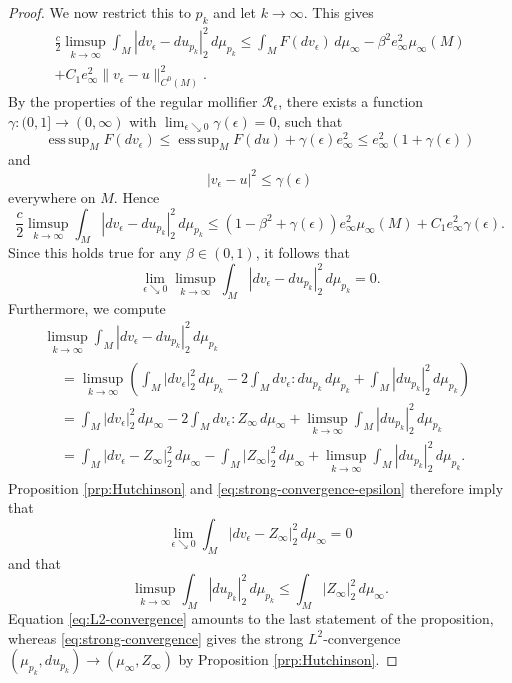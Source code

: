 \documentclass[10pt,a4paper]{amsart}
\DeclareMathOperator*{\esssup}{ess \, sup}
\begin{document}
\begin{proof}
We now restrict this to $p_k$ and let $k \to \infty$. This gives
\begin{multline*}
\frac{c}{2} \limsup_{k \to \infty} \int_M |dv_\epsilon - du_{p_k}|_2^2 \, d\mu_{p_k} \le \int_M F(dv_\epsilon) \, d\mu_\infty - \beta^2 e_\infty^2 \mu_\infty(M) \\
+ C_1 e_\infty^2 \|v_\epsilon - u\|_{C^0(M)}^2.
\end{multline*}
By the properties of the regular mollifier $\mathcal{R}_\epsilon$, there exists a function $\gamma \colon (0, 1] \to (0, \infty)$ with $\lim_{\epsilon \searrow 0} \gamma(\epsilon) = 0$, such that
\[
\esssup_M F(dv_\epsilon) \le \esssup_M F(du) + \gamma(\epsilon) e_\infty^2 \le e_\infty^2 (1 + \gamma(\epsilon))
\]
and
\[
|v_\epsilon - u|^2 \le \gamma(\epsilon)
\]
everywhere on $M$. Hence
\[
\frac{c}{2} \limsup_{k \to \infty} \int_M |dv_\epsilon - du_{p_k}|_2^2 \, d\mu_{p_k} \le  (1 - \beta^2 + \gamma(\epsilon)) e_\infty^2 \mu_\infty(M) + C_1 e_\infty^2 \gamma(\epsilon).
\]
Since this holds true for any $\beta \in (0, 1)$, it follows that
\begin{equation} \label{eq:strong-convergence-epsilon}
\lim_{\epsilon \searrow 0} \limsup_{k \to \infty} \int_M |dv_\epsilon - du_{p_k}|_2^2 \, d\mu_{p_k} = 0.
\end{equation}
Furthermore, we compute
\begin{multline*}
\limsup_{k \to \infty} \int_M |dv_\epsilon - du_{p_k}|_2^2 \, d\mu_{p_k} \\
\begin{aligned}
& = \limsup_{k \to \infty} \left(\int_M |dv_\epsilon|_2^2 \, d\mu_{p_k} - 2 \int_M dv_\epsilon : du_{p_k} \, d\mu_{p_k} + \int_M |du_{p_k}|_2^2 \, d\mu_{p_k}\right) \\
& = \int_M |dv_\epsilon|_2^2 \, d\mu_\infty - 2 \int_M dv_\epsilon : Z_\infty \, d\mu_\infty + \limsup_{k \to \infty} \int_M |du_{p_k}|_2^2 \, d\mu_{p_k} \\
& = \int_M |dv_\epsilon - Z_\infty|_2^2 \, d\mu_\infty - \int_M |Z_\infty|_2^2 \, d\mu_\infty + \limsup_{k \to \infty} \int_M |du_{p_k}|_2^2 \, d\mu_{p_k}.
\end{aligned}
\end{multline*}
Proposition \ref{prp:Hutchinson} and \eqref{eq:strong-convergence-epsilon} therefore imply that
\begin{equation} \label{eq:L2-convergence}
\lim_{\epsilon \searrow 0} \int_M |dv_\epsilon - Z_\infty|_2^2 \, d\mu_\infty = 0
\end{equation}
and that
\begin{equation} \label{eq:strong-convergence}
\limsup_{k \to \infty} \int_M |du_{p_k}|_2^2 \, d\mu_{p_k} \le \int_M |Z_\infty|_2^2 \, d\mu_\infty.
\end{equation}
Equation \eqref{eq:L2-convergence} amounts to the last statement of the proposition, whereas \eqref{eq:strong-convergence} gives the strong $L^2$-convergence $(\mu_{p_k}, du_{p_k}) \to (\mu_\infty, Z_\infty)$
by Proposition \ref{prp:Hutchinson}.


\end{proof}
\end{document}
